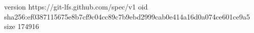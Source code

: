 version https://git-lfs.github.com/spec/v1
oid sha256:ef0387115675e8b7cf9c04cc89c7b9ebd2999cab0e414a16d0a074ce601ce9a5
size 174916
